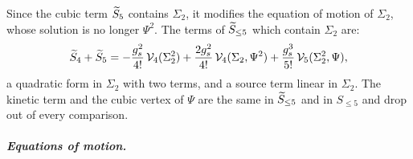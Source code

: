 Since the cubic term $\caction[5]$ contains $\Sigma_2$, it modifies the equation of motion of $\Sigma_2$, whose solution is no longer $\Psi^2$.
The terms of $\caction[\le 5]$ which contain $\Sigma_2$ are:
\begin{equation}
  \label{p:eq:hs5:F}
  \caction[4] + \caction[5]
    = - \frac{\gs^2}{4!} \, \vertex{4}(\Sigma_2^2)
      + \frac{2 \gs^2}{4!} \, \vertex{4}(\Sigma_2, \Psi^2)
      + \frac{\gs^3}{5!} \, \vertex{5}(\Sigma_2^2, \Psi),
\end{equation}
a quadratic form in $\Sigma_2$ with two terms, and a source term linear in $\Sigma_2$.
The kinetic term and the cubic vertex of $\Psi$ are the same in $\caction[\le 5]$ and in $S_{\le 5}$ and drop out of every comparison.


\subparagraph{Equations of motion.}

